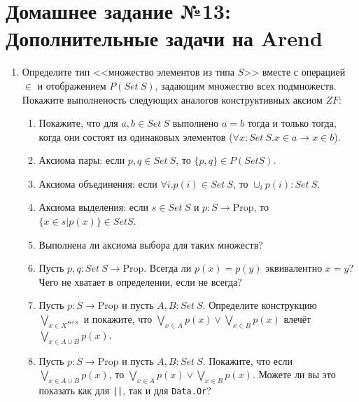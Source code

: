 \documentclass[10pt,a4paper,oneside]{article}
\begin{document}
\section*{Домашнее задание №13: Дополнительные задачи на Arend}
\begin{enumerate}
\item Определите тип <<множество элементов из типа $S$>> вместе с операцией $\in$ и отображением $P(Set\ S)$, задающим множество всех подмножеств. 
Покажите выполненость следующих аналогов конструктивных аксиом $ZF$:
\begin{enumerate}
\item Покажите, что для $a,b \in Set\ S$ выполнено $a = b$ тогда и только тогда, когда они состоят из одинаковых элементов ($\forall x:Set\ S.x \in a \rightarrow x \in b$).
\item Аксиома пары: если $p,q \in Set\ S$, то $\{p,q\} \in P(Set S)$.
\item Аксиома объединения: если $\forall i.p(i) \in Set\ S$, то $\cup_i p(i) : Set\ S$.
\item Аксиома выделения: если $s \in Set\ S$ и $p : S \rightarrow \text{Prop}$, то $\{ x\in s | p(x)\} \in Set S$.
\item Выполнена ли аксиома выбора для таких множеств?
\item Пусть $p,q: Set\ S \rightarrow \text{Prop}$. Всегда ли $p(x) = p(y)$ эквивалентно $x=y$? Чего не хватает в определении, если не всегда?
\item Пусть $p: S \rightarrow \text{Prop}$ и пусть $A,B : Set\ S$. Определите конструкцию $\bigvee_{x \in X^{Set\ S}}$ и 
покажите, что $\bigvee_{x \in A} p(x) \vee \bigvee_{x \in B} p(x)$ влечёт $\bigvee_{x\in A\cup B} p(x)$. 
\item Пусть $p: S \rightarrow \text{Prop}$ и пусть $A,B : Set\ S$. Покажите, что если $\bigvee_{x\in A\cup B} p(x)$, то $\bigvee_{x \in A} p(x) \vee \bigvee_{x \in B} p(x)$.
Можете ли вы это показать как для \verb!||!, так и для \verb!Data.Or!?
\end{enumerate}
\end{enumerate}
\end{document}
